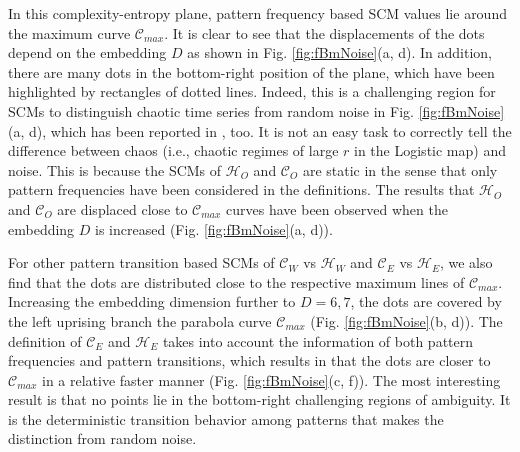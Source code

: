 \documentclass[12pt,aip,cha,reprint,nofootinbib]{revtex4-1}
\begin{document}
In this complexity-entropy plane, pattern frequency based SCM values lie around the maximum curve $\mathcal{C}_{max}$. It is clear to see that the displacements of the dots depend on the embedding $D$ as shown in Fig. \ref{fig:fBmNoise}(a, d). In addition, there are many dots in the bottom-right position of the plane, which have been highlighted by rectangles of dotted lines. Indeed, this is a challenging region for SCMs to distinguish chaotic time series from random noise in Fig. \ref{fig:fBmNoise}(a, d), which has been reported in \cite{BorgesAMC2019}, too. It is not an easy task to correctly tell the difference between chaos (i.e., chaotic regimes of large $r$ in the Logistic map) and noise. This is because the SCMs of $\mathcal{H}_O$ and $\mathcal{C}_O$ are static in the sense that only pattern frequencies have been considered in the definitions. The results that  $\mathcal{H}_O$ and $\mathcal{C}_O$ are displaced close to $\mathcal{C}_{max}$ curves have been observed when the embedding $D$ is increased (Fig. \ref{fig:fBmNoise}(a, d)). 

For other pattern transition based SCMs of $\mathcal{C}_W$ vs $\mathcal{H}_W$ and $\mathcal{C}_E$ vs $\mathcal{H}_E$, we also find that the dots are distributed close to the respective maximum lines of $\mathcal{C}_{max}$. Increasing the embedding dimension further to $D=6, 7$, the dots are covered by the left uprising branch the parabola curve $\mathcal{C}_{max}$ (Fig. \ref{fig:fBmNoise}(b, d)). The definition of $\mathcal{C}_{E}$ and $\mathcal{H}_{E}$ takes into account the information of both pattern frequencies and pattern transitions, which results in that the dots are closer to $\mathcal{C}_{max}$ in a relative faster manner (Fig. \ref{fig:fBmNoise}(c, f)). The most interesting result is that no points lie in the bottom-right challenging regions of ambiguity. It is the deterministic transition behavior among patterns that makes the distinction from random noise. 

\end{document}
